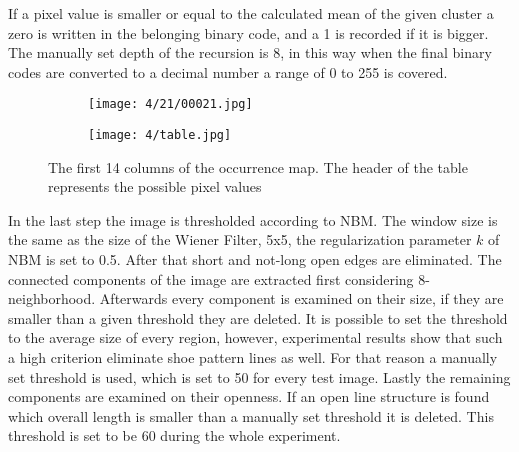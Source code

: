 \documentclass[draft,final]{vutinfth} %
\begin{document}
If a pixel value is smaller or equal to the calculated mean of the given cluster a zero is written in the belonging binary code, and a 1 is recorded if it is bigger.
The manually set depth of the recursion is 8, in this way when the final binary codes are converted to a decimal number a range of 0 to 255 is covered.
\begin{figure}[h]
  \centering
  \begin{subfigure}[t]{0.09\columnwidth}
    \centering
    \texttt{[image: 4/21/00021.jpg]}
  \end{subfigure}
  \begin{subfigure}[t]{0.9\columnwidth}
    \centering
    \texttt{[image: 4/table.jpg]}
  \end{subfigure}
  \caption{The first 14 columns of the occurrence map. The header of the table represents the possible pixel values }
  \label{fig:fans:table} %
\end{figure}
\par
In the last step the image is thresholded according to NBM.
The window size is the same as the size of the Wiener Filter, 5x5, the regularization parameter $k$ of NBM is set to 0.5.
After that short and not-long open edges are eliminated.
The connected components of the image are extracted first considering 8-neighborhood.
Afterwards every component is examined on their size, if they are smaller than a given threshold they are deleted.
It is possible to set the threshold to the average size of every region, however, experimental results show that such a high criterion eliminate shoe pattern lines as well.
For that reason a manually set threshold is used, which is set to 50 for every test image.
Lastly the remaining components are examined on their openness.
If an open line structure is found which overall length is smaller than a manually set threshold it is deleted.
This threshold is set to be 60 during the whole experiment.
\end{document}
